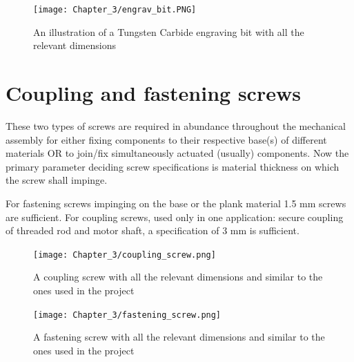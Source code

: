 \begin{figure}[h]
 \centering
 \texttt{[image: Chapter\_3/engrav\_bit.PNG]}
 \caption{An illustration of a Tungsten Carbide engraving bit with all the relevant dimensions}
 \label{fig:ebit}
\end{figure}

\section{Coupling and fastening screws} \label{screws}
These two types of screws are required in abundance throughout the mechanical assembly for either fixing components to their respective base(s) of different materials OR to join/fix simultaneously actuated (usually) components. Now the primary parameter deciding screw specifications is material thickness on which the screw shall impinge. \par

For fastening screws impinging on the base or the plank material 1.5 mm screws are sufficient. For coupling screws, used only in one application: secure coupling of threaded rod and motor shaft, a specification of 3 mm is sufficient.

\begin{figure}[h]
 \centering
 \texttt{[image: Chapter\_3/coupling\_screw.png]}
 \caption{A coupling screw with all the relevant dimensions and similar to the ones used in the project}
 \label{fig:cscrew}
\end{figure} 

\begin{figure}[h]
 \centering
 \texttt{[image: Chapter\_3/fastening\_screw.png]}
 \caption{A fastening screw with all the relevant dimensions and similar to the ones used in the project}
 \label{fig:fscrew}
\end{figure}
